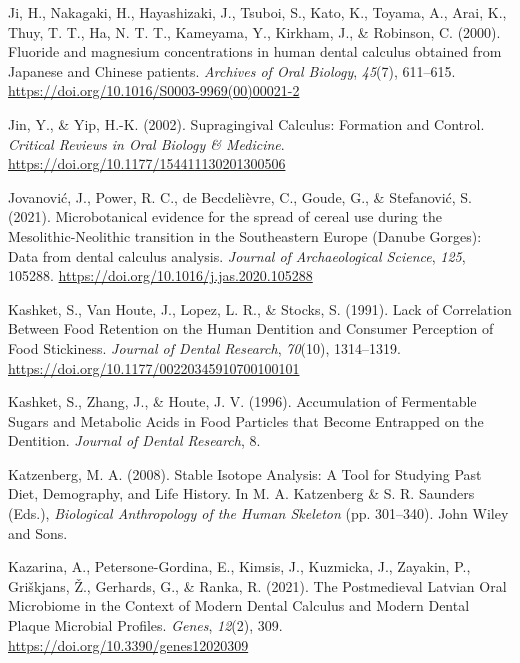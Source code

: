 \documentclass[
  letterpaper,
]{book}
\newlength{\cslhangindent}
\newlength{\cslentryspacingunit} %
\newenvironment{CSLReferences}[2] %
 {%
  \setlength{\parindent}{0pt}
  \ifodd #1
  \let\oldpar\par
  \def\par{\hangindent=\cslhangindent\oldpar}
  \fi
  \setlength{\parskip}{#2\cslentryspacingunit}
 }%
 {}
\begin{document}
\begin{CSLReferences}{1}{0}
\leavevmode{}%
Ji, H., Nakagaki, H., Hayashizaki, J., Tsuboi, S., Kato, K., Toyama, A.,
Arai, K., Thuy, T. T., Ha, N. T. T., Kameyama, Y., Kirkham, J., \&
Robinson, C. (2000). Fluoride and magnesium concentrations in human
dental calculus obtained from {Japanese} and {Chinese} patients.
\emph{Archives of Oral Biology}, \emph{45}(7), 611--615.
\url{https://doi.org/10.1016/S0003-9969(00)00021-2}

\leavevmode{}%
Jin, Y., \& Yip, H.-K. (2002). Supragingival {Calculus}: {Formation} and
{Control}. \emph{Critical Reviews in Oral Biology \& Medicine}.
\url{https://doi.org/10.1177/154411130201300506}

\leavevmode{}%
Jovanović, J., Power, R. C., de Becdelièvre, C., Goude, G., \&
Stefanović, S. (2021). Microbotanical evidence for the spread of cereal
use during the {Mesolithic-Neolithic} transition in the {Southeastern
Europe} ({Danube Gorges}): {Data} from dental calculus analysis.
\emph{Journal of Archaeological Science}, \emph{125}, 105288.
\url{https://doi.org/10.1016/j.jas.2020.105288}

\leavevmode{}%
Kashket, S., Van Houte, J., Lopez, L. R., \& Stocks, S. (1991). Lack of
{Correlation Between Food Retention} on the {Human Dentition} and
{Consumer Perception} of {Food Stickiness}. \emph{Journal of Dental
Research}, \emph{70}(10), 1314--1319.
\url{https://doi.org/10.1177/00220345910700100101}

\leavevmode{}%
Kashket, S., Zhang, J., \& Houte, J. V. (1996). Accumulation of
{Fermentable Sugars} and {Metabolic Acids} in {Food Particles} that
{Become Entrapped} on the {Dentition}. \emph{Journal of Dental
Research}, 8.

\leavevmode{}%
Katzenberg, M. A. (2008). Stable {Isotope Analysis}: {A Tool} for
{Studying Past Diet}, {Demography}, and {Life History}. In M. A.
Katzenberg \& S. R. Saunders (Eds.), \emph{Biological {Anthropology} of
the {Human Skeleton}} (pp. 301--340). {John Wiley and Sons}.

\leavevmode{}%
Kazarina, A., Petersone-Gordina, E., Kimsis, J., Kuzmicka, J., Zayakin,
P., Griškjans, Ž., Gerhards, G., \& Ranka, R. (2021). The {Postmedieval
Latvian Oral Microbiome} in the {Context} of {Modern Dental Calculus}
and {Modern Dental Plaque Microbial Profiles}. \emph{Genes},
\emph{12}(2), 309. \url{https://doi.org/10.3390/genes12020309}


\end{CSLReferences}
\end{document}
